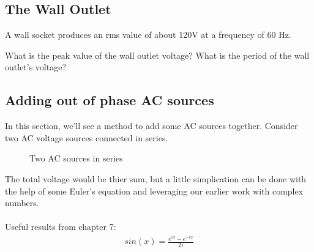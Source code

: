 \subsection{The Wall Outlet}
A wall socket produces an rms value of about 120V at a frequency of 60 Hz. 

\begin{blevel}
What is the peak value of the wall outlet voltage? What is the period of the wall outlet's voltage?
\end{blevel}


\subsection{Adding out of phase AC sources}
In this section, we'll see a method to add some AC sources together. Consider two AC voltage sources connected in series.

\begin{figure}[H]
\begin{center}
\caption{Two AC sources in series}
\end{center}
\end{figure}

The total voltage would be thier sum, but a little simplication can be done with the help of some Euler's equation and leveraging our earlier work with complex numbers.\\
\\
Useful results from chapter 7:
\begin{align}
sin(x)=\frac{e^{ix}-e^{-ix}}{2i} \label{E:8SIN}
\end{align}

